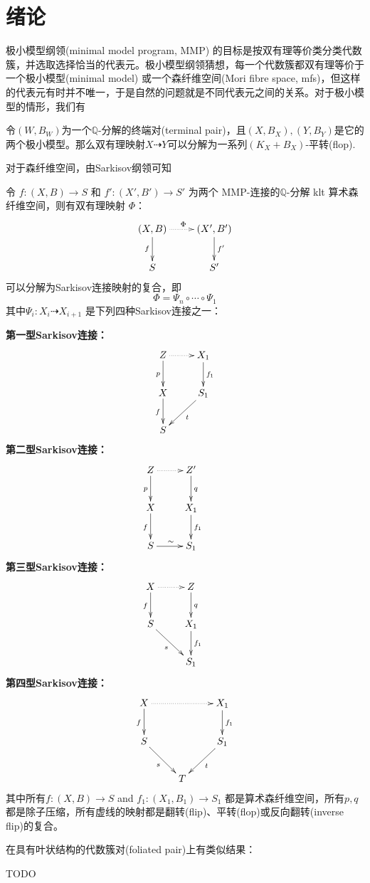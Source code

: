 \chapter{绪论}
极小模型纲领(minimal model program, MMP) 的目标是按双有理等价类分类代数簇，并选取选择恰当的代表元。极小模型纲领猜想，每一个代数簇都双有理等价于一个极小模型(minimal model) 或一个森纤维空间(Mori fibre space, mfs)，但这样的代表元有时并不唯一，于是自然的问题就是不同代表元之间的关系。对于极小模型的情形，我们有
\begin{theorem}[平转连接极小模型]
	令$(W,B_{W})$为一个$\mathbb{Q}$-分解的终端对(terminal pair)，且$(X,B_{X}),(Y,B_{Y})$是它的两个极小模型。那么双有理映射$X \dashrightarrow Y$可以分解为一系列$(K_{X}+B_{X})$-平转(flop).
\end{theorem}
对于森纤维空间，由Sarkisov纲领可知
\begin{theorem}[主定理]
	令 $ f:(X, B)\to S$ 和 $f':(X', B')\to S' $ 为两个 MMP-连接的$ \mathbb{Q} $-分解 klt 算术森纤维空间，则有双有理映射 $\Phi$：
	\[
		\xymatrix{
			(X,B)\ar[d]_f\ar@{.>}[r]^\Phi & (X',B')\ar[d]^{f'}\\
			S & S'}
	\]
	可以分解为Sarkisov连接映射的复合，即
	\[
		\Phi=\Psi_{n}\circ \cdots \circ \Psi_{1}
	\]
	其中$\Psi_{i}:X_{i}\dashrightarrow X_{i+1} $ 是下列四种Sarkisov连接之一：

  \textbf{第一型Sarkisov连接：}
  \[\xymatrix{
			Z\ar[d]_p\ar@{.>}[r]&X_1\ar[d]^{f_1}\\
			X\ar[d]_f&S_1\ar[dl]^{t}\\
  S &}\]
  \textbf{第二型Sarkisov连接：}
  \[\xymatrix{
			Z\ar[d]_p\ar@{.>}[r]&Z'\ar[d]^{q}&\\
			X\ar[d]_{f}&X_1\ar[d]^{f_1}\\
  S\ar[r]^{\sim}&S_1}\]
  \textbf{第三型Sarkisov连接：}
\[ \xymatrix{
		X\ar@{.>}[r]\ar[d]_f& Z\ar[d]^q& \\
		S\ar[rd]_{s}         & X_{1}\ar[d]^{f_{1}}&\\
		&S_{1}
		} \]
  \textbf{第四型Sarkisov连接：}
\[ \xymatrix{
			X\ar[d]_f\ar@{.>}[rr]&&X_1\ar[d]^{f_1}\\
			S\ar[dr]_{s}&&S_1\ar[dl]^{t}\\
			&T &} \]
	其中所有$ f:(X, B)\to S $ and $ f_1:(X_1, B_1)\to S_1 $ 都是算术森纤维空间，所有$p,q$ 都是除子压缩，所有虚线的映射都是翻转(flip)、平转(flop)或反向翻转(inverse flip)的复合。
\end{theorem}
在具有叶状结构的代数簇对(foliated pair)上有类似结果：
\begin{theorem}[主定理2]
	TODO
\end{theorem}


